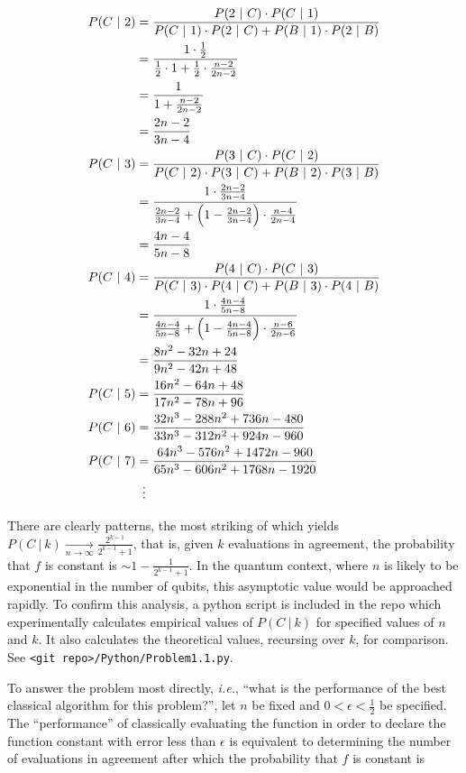 \begin{align*}
P(C\ |\  2)&=\frac{P(2\ |\ C)\cdot P(C\ |\ 1)}{ P(C\ |\ 1) \cdot P(2\ |\ C) +  P(B\ |\ 1) \cdot P(2\ |\ B)} \\
&=\frac{1\cdot\frac12}{\frac12\cdot1+\frac12\cdot\frac{n-2}{2n-2}} \\
&=\frac{1}{1+\frac{n-2}{2n-2}} \\
&=\frac{2n-2}{3n-4} \\
P(C\ |\ 3)&=\frac{P(3\ |\ C)\cdot P(C\ |\ 2)}{ P(C\ |\ 2) \cdot P(3\ |\ C) +  P(B\ |\ 2) \cdot P(3\ |\ B)} \\
&=\frac{1\cdot\frac{2n-2}{3n-4}}{\frac{2n-2}{3n-4}+\left(1-\frac{2n-2}{3n-4}\right)\cdot\frac{n-4}{2n-4}} \\
&=\frac{4n-4}{5n-8} \\
P(C\ |\ 4)&=\frac{P(4\ |\ C)\cdot P(C\ |\ 3)}{ P(C\ |\ 3) \cdot P(4\ |\ C) +  P(B\ |\ 3) \cdot P(4\ |\ B)} \\
&=\frac{1\cdot\frac{4n-4}{5n-8}}{\frac{4n-4}{5n-8}+\left(1-\frac{4n-4}{5n-8}\right)\cdot\frac{n-6}{2n-6}} \\
&=\frac{8n^2-32n+24}{9n^2-42n+48} \\
P(C\ |\ 5)&=\frac{16n^2-64n+48}{17n^2-78n+96} \\
P(C\ |\ 6)&=\frac{32n^3-288n^2+736n-480}{33n^3-312n^2+924n-960} \\
P(C\ |\ 7)&=\frac{64n^3-576n^2+1472n-960}{65n^3-606n^2+1768n-1920} \\
&\mathrel{\makebox[\widthof{=}]{\vdots}}
\end{align*}

There are clearly patterns, the most striking of which yields $P(C\ |\ k) \xrightarrow[n\to\infty]{}\frac{2^{k-1}}{2^{k-1}+1}$, that is, given $k$ evaluations in agreement, the probability that $f$ is constant is $\sim1-\frac{1}{2^{k-1}+1}$.  In the quantum context, where $n$ is likely to be exponential in the number of qubits, this asymptotic value would be approached rapidly.  To confirm this analysis, a python script is included in the repo which experimentally calculates empirical values of $P(C\ |\ k)$ for specified values of $n$ and $k$.  It also calculates the theoretical values, recursing over $k$, for comparison.  See \texttt{<git repo>/Python/Problem1.1.py}.

To answer the problem most directly, \textit{i.e.}, ``what is the performance of the best classical algorithm for this problem?'', let $n$ be fixed and $0<\epsilon<\frac{1}{2}$ be specified.  The ``performance'' of classically evaluating the function in order to declare the function constant with error less than $\epsilon$  is equivalent to determining the number of evaluations in agreement after which the probability that $f$ is constant is  

